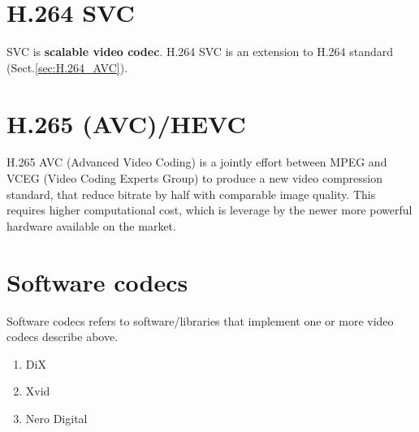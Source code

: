 \section{H.264 SVC}

SVC is {\bf scalable video codec}. H.264 SVC is an extension to H.264 standard
(Sect.\ref{sec:H.264_AVC}).

\section{H.265 (AVC)/HEVC}

H.265 AVC (Advanced Video Coding) is a jointly effort between MPEG and VCEG
(Video Coding Experts Group) to produce a new video compression standard, that
reduce bitrate by half with comparable image quality. This requires higher
computational cost, which is leverage by the newer more powerful hardware
available on the market.


\section{Software codecs}

Software codecs refers to software/libraries that implement one or more video
codecs describe above.

\begin{enumerate}
  \item DiX
  \item Xvid
  \item Nero Digital
\end{enumerate}
